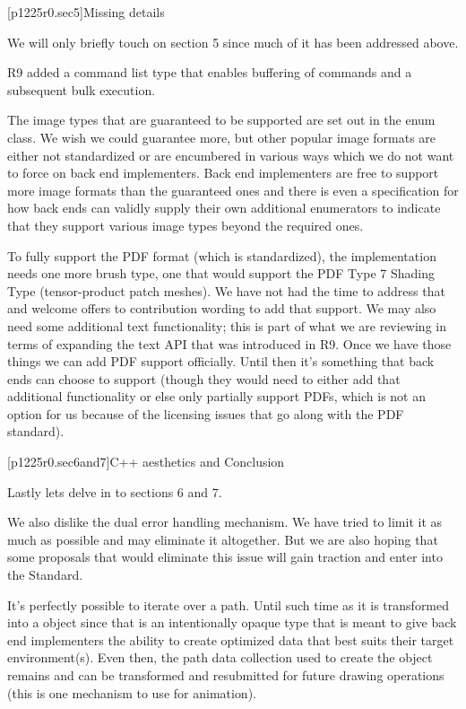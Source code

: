 [p1225r0.sec5]{Missing details}

\pnum
We will only briefly touch on section 5 since much of it has been addressed above.

\pnum
R9 added a command list type that enables buffering of commands and a subsequent bulk execution.

\pnum
The image types that are guaranteed to be supported are set out in the  enum class. We wish we could guarantee more, but other popular image formats are either not standardized or are encumbered in various ways which we do not want to force on back end implementers. Back end implementers are free to support more image formats than the guaranteed ones and there is even a specification for how back ends can validly supply their own additional enumerators to indicate that they support various image types beyond the required ones.

\pnum
To fully support the PDF format (which is standardized), the implementation needs one more brush type, one that would support the PDF Type 7 Shading Type (tensor-product patch meshes). We have not had the time to address that and welcome offers to contribution wording to add that support. We may also need some additional text functionality; this is part of what we are reviewing in terms of expanding the text API that was introduced in R9. Once we have those things we can add PDF support officially. Until then it's something that back ends can choose to support (though they would need to either add that additional functionality or else only partially support PDFs, which is not an option for us because of the licensing issues that go along with the PDF standard).

[p1225r0.sec6and7]{C++ aesthetics and Conclusion}

\pnum
Lastly lets delve in to sections 6 and 7.

\pnum
We also dislike the dual error handling mechanism. We have tried to limit it as much as possible and may eliminate it altogether. But we are also hoping that some proposals that would eliminate this issue will gain traction and enter into the Standard.

\pnum
It's perfectly possible to iterate over a path. Until such time as it is transformed into a  object since that is an intentionally opaque type that is meant to give back end implementers the ability to create optimized data that best suits their target environment(s). Even then, the path data collection used to create the  object remains and can be transformed and resubmitted for future drawing operations (this is one mechanism to use for animation).

